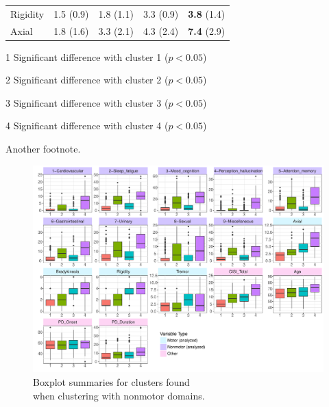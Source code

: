 \documentclass[preprint,3p,twocolumn]{elsarticle} %
\begin{document}
\begin{table}[t]
\begin{threeparttable}
\begin{tabular}{l r r r r}
    Rigidity & 1.5 (0.9)\tnote{234} & 1.8 (1.1)\tnote{134} & 3.3 (0.9)\tnote{124} &
    \textbf{3.8} (1.4)\tnote{123} \\
    Axial & 1.8 (1.6)\tnote{234} & 3.3 (2.1)\tnote{134} & 4.3 (2.4)\tnote{124} &
    \textbf{7.4} (2.9)\tnote{123} \\
    \bottomrule
  \end{tabular}
  \begin{tablenotes}
    \small
    \item[1] Significant difference with cluster 1 ($p < 0.05$)
    \item[2] Significant difference with cluster 2 ($p < 0.05$)
    \item[3] Significant difference with cluster 3 ($p < 0.05$)
    \item[4] Significant difference with cluster 4 ($p < 0.05$)
    \item[\textdagger] Another footnote.
  \end{tablenotes}
  \end{threeparttable}
\end{table}

\begin{figure}[b]
  \centering
  \includegraphics[width=\linewidth]{kmeans-summaries-4-pub.pdf}
  \vspace{-7.5em}
  \captionsetup{justification=raggedleft,
    singlelinecheck=false
  }
  \caption{Boxplot summaries for clusters found \\ when clustering with nonmotor domains.}
  \label{fig:box}
\end{figure}
\end{document}
